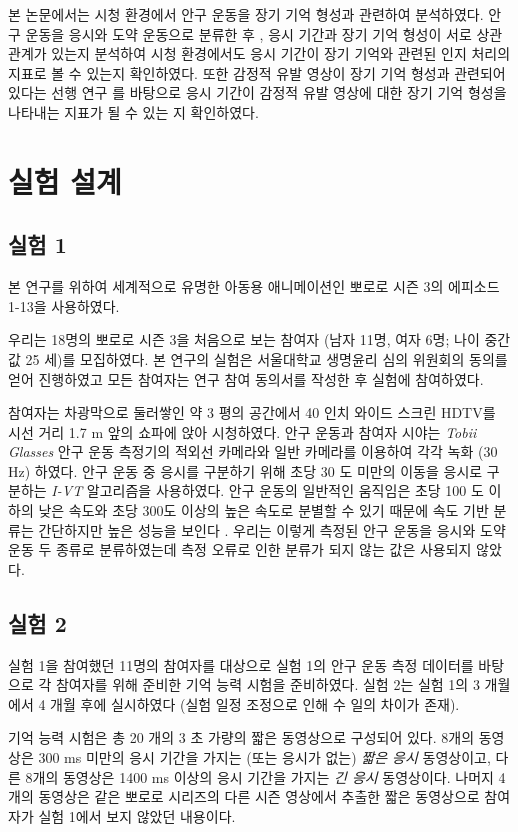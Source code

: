 \documentclass{kcc}
\begin{document}
본 논문에서는 시청 환경에서 안구 운동을 장기 기억 형성과 관련하여 분석하였다. 안구 운동을 응시와 도약 운동으로 분류한 후 \cite{Findlay1999,Feng2003,Feng2006}, 응시 기간과 장기 기억 형성이 서로 상관 관계가 있는지 분석하여 시청 환경에서도 응시 기간이 장기 기억와 관련된 인지 처리의 지표로 볼 수 있는지 확인하였다. 또한 감정적 유발 영상이 장기 기억 형성과 관련되어 있다는 선행 연구 \cite{Cahill1996amyg,Cahill1998baso}를 바탕으로 응시 기간이 감정적 유발 영상에 대한 장기 기억 형성을 나타내는 지표가 될 수 있는 지 확인하였다. 

\section{실험 설계}

\subsection{실험 1}
본 연구를 위하여 세계적으로 유명한 아동용 애니메이션인 뽀로로 시즌 3의 에피소드 1-13을 사용하였다. 

우리는 18명의 뽀로로 시즌 3을 처음으로 보는 참여자 (남자 11명, 여자 6명; 나이 중간 값 25 세)를 모집하였다. 본 연구의 실험은 서울대학교 생명윤리 심의 위원회의 동의를 얻어 진행하였고 모든 참여자는 연구 참여 동의서를 작성한 후 실험에 참여하였다.

참여자는 차광막으로 둘러쌓인 약 3 평의 공간에서 40 인치 와이드 스크린 HDTV를 시선 거리 1.7 m 앞의 쇼파에 앉아 시청하였다. 안구 운동과 참여자 시야는 \textit{Tobii Glasses} 안구 운동 측정기의 적외선 카메라와 일반 카메라를 이용하여 각각 녹화 (30 Hz) 하였다. 안구 운동 중 응시를 구분하기 위해 초당 30 도 미만의 이동을 응시로 구분하는 \textit{I-VT} 알고리즘을 사용하였다. 안구 운동의 일반적인 움직임은 초당 100 도 이하의 낮은 속도와 초당 300도 이상의 높은 속도로 분별할 수 있기 때문에 속도 기반 분류는 간단하지만 높은 성능을 보인다 \cite{Salvucci2000}. 우리는 이렇게 측정된 안구 운동을 응시와 도약 운동 두 종류로 분류하였는데 측정 오류로 인한 분류가 되지 않는 값은 사용되지 않았다. 


\subsection{실험 2}
\label{subsec:experiment2}
실험 1을 참여했던 11명의 참여자를 대상으로 실험 1의 안구 운동 측정 데이터를 바탕으로 각 참여자를 위해 준비한 기억 능력 시험을 준비하였다. 실험 2는 실험 1의 3 개월에서 4 개월 후에 실시하였다 (실험 일정 조정으로 인해 수 일의 차이가 존재).

기억 능력 시험은 총 20 개의 3 초 가량의 짧은 동영상으로 구성되어 있다. 8개의 동영상은 300 ms 미만의 응시 기간을 가지는 (또는 응시가 없는) \textit{짧은 응시} 동영상이고, 다른 8개의 동영상은 1400 ms 이상의 응시 기간을 가지는 \textit{긴 응시} 동영상이다. 나머지 4개의 동영상은 같은 뽀로로 시리즈의 다른 시즌 영상에서 추출한 짧은 동영상으로 참여자가 실험 1에서 보지 않았던 내용이다.
\end{document}
